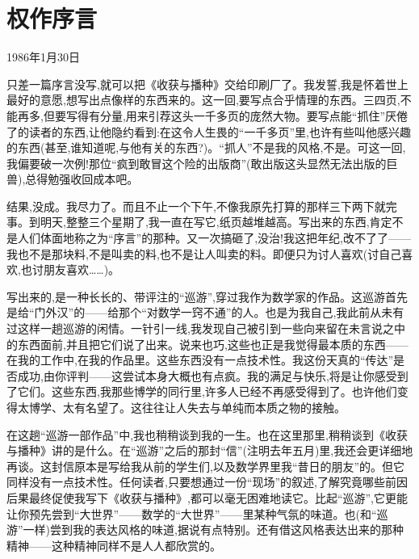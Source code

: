 \chapter{权作序言}


\noindent\pmark 1986年1月30日\par

 只差一篇序言没写,就可以把《收获与播种》交给印刷厂了。我发誓,我是怀着世上最好的意愿,想写出点像样的东西来的。这一回,要写点合乎情理的东西。三四页,不能再多,但要写得有分量,用来引荐这头一千多页的庞然大物。要写点能“抓住”厌倦了的读者的东西,让他隐约看到:在这令人生畏的“一千多页”里,也许有些叫他感兴趣的东西(甚至,谁知道呢,与他有关的东西?)。“抓人”不是我的风格,不是。可这一回,我偏要破一次例!那位“疯到敢冒这个险的出版商”(敢出版这头显然无法出版的巨兽),总得勉强收回成本吧。

结果,没成。我尽力了。而且不止一个下午,不像我原先打算的那样三下两下就完事。到明天,整整三个星期了,我一直在写它,纸页越堆越高。写出来的东西,肯定不是人们体面地称之为“序言”的那种。又一次搞砸了,没治!我这把年纪,改不了了——我也不是那块料,不是叫卖的料,也不是让人叫卖的料。即便只为讨人喜欢(讨自己喜欢,也讨朋友喜欢……)。

写出来的,是一种长长的、带评注的“巡游”,穿过我作为数学家的作品。这巡游首先是给“门外汉”的——给那个“对数学一窍不通”的人。也是为我自己,我此前从未有过这样一趟巡游的闲情。一针引一线,我发现自己被引到一些向来留在未言说之中的东西面前,并且把它们说了出来。说来也巧,这些也正是我觉得最本质的东西——在我的工作中,在我的作品里。这些东西没有一点技术性。我这份天真的“传达”是否成功,由你评判——这尝试本身大概也有点疯。我的满足与快乐,将是让你感受到了它们。这些东西,我那些博学的同行里,许多人已经不再感受得到了。也许他们变得太博学、太有名望了。这往往让人失去与单纯而本质之物的接触。

在这趟“巡游一部作品”中,我也稍稍谈到我的一生。也在这里那里,稍稍谈到《收获与播种》讲的是什么。在“巡游”之后的那封“信”(注明去年五月)里,我还会更详细地再谈。这封信原本是写给我从前的学生们,以及数学界里我“昔日的朋友”的。但它同样没有一点技术性。任何读者,只要想通过一份“现场”的叙述,了解究竟哪些前因后果最终促使我写下《收获与播种》,都可以毫无困难地读它。比起“巡游”,它更能让你预先尝到“大世界”——数学的“大世界”——里某种气氛的味道。也(和“巡游”一样)尝到我的表达风格的味道,据说有点特别。还有借这风格表达出来的那种精神——这种精神同样不是人人都欣赏的。

